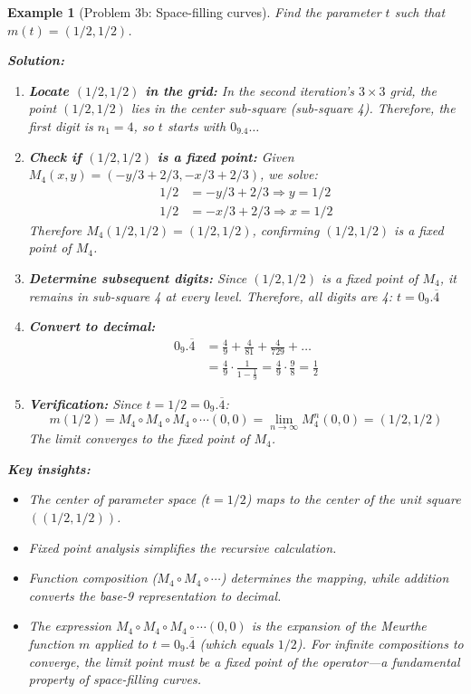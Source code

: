 \documentclass[11pt,a4paper]{article}
\newtheorem{example}[theorem]{Example}
\begin{document}
\begin{example}[Problem 3b: Space-filling curves]

Find the parameter $t$ such that $m(t) = (1/2, 1/2)$.

\textbf{Solution:}

\begin{enumerate}
    \item \textbf{Locate $(1/2, 1/2)$ in the grid:} 
    In the second iteration's $3 \times 3$ grid, the point $(1/2, 1/2)$ lies in the center sub-square (sub-square 4). Therefore, the first digit is $n_1 = 4$, so $t$ starts with $0_9.4\ldots$
    
    \item \textbf{Check if $(1/2, 1/2)$ is a fixed point:}
    Given $M_4(x,y) = (-y/3 + 2/3, -x/3 + 2/3)$, we solve:
    \begin{align}
        1/2 &= -y/3 + 2/3 \Rightarrow y = 1/2\\
        1/2 &= -x/3 + 2/3 \Rightarrow x = 1/2
    \end{align}
    Therefore $M_4(1/2, 1/2) = (1/2, 1/2)$, confirming $(1/2, 1/2)$ is a fixed point of $M_4$.
    
    \item \textbf{Determine subsequent digits:}
    Since $(1/2, 1/2)$ is a fixed point of $M_4$, it remains in sub-square 4 at every level. Therefore, all digits are 4: $t = 0_9.\overline{4}$
    
    \item \textbf{Convert to decimal:}
    \begin{align}
        0_9.\overline{4} &= \frac{4}{9} + \frac{4}{81} + \frac{4}{729} + \ldots \\
        &= \frac{4}{9} \cdot \frac{1}{1-\frac{1}{9}} = \frac{4}{9} \cdot \frac{9}{8} = \frac{1}{2}
    \end{align}
    
    \item \textbf{Verification:}
    Since $t = 1/2 = 0_9.\overline{4}$:
    $$m(1/2) = M_4 \circ M_4 \circ M_4 \circ \cdots (0,0) = \lim_{n \to \infty} M_4^n(0,0) = (1/2, 1/2)$$
    The limit converges to the fixed point of $M_4$.
\end{enumerate}

\textbf{Key insights:}
\begin{itemize}
    \item The center of parameter space ($t = 1/2$) maps to the center of the unit square $((1/2, 1/2))$.
    \item Fixed point analysis simplifies the recursive calculation.
    \item Function composition ($M_4 \circ M_4 \circ \cdots$) determines the mapping, while addition converts the base-9 representation to decimal.
    \item The expression $M_4 \circ M_4 \circ M_4 \circ \cdots (0,0)$ is the expansion of the Meurthe function $m$ applied to $t = 0_9.\overline{4}$ (which equals $1/2$). For infinite compositions to converge, the limit point must be a fixed point of the operator—a fundamental property of space-filling curves.
\end{itemize}


\end{example}
\end{document}
